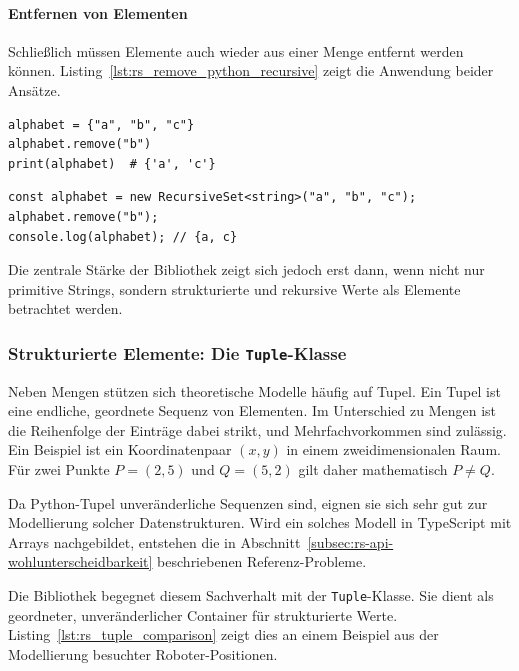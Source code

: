 \paragraph{Entfernen von Elementen}
Schließlich müssen Elemente auch wieder aus einer Menge entfernt werden können. Listing~\ref{lst:rs_remove_python_recursive} zeigt die Anwendung beider Ansätze.

\begin{listing}[ht]
    \caption{Entfernen von Elementen in Python und mit \texttt{RecursiveSet}}
    \label{lst:rs_remove_python_recursive}
    \begin{verbatim}
alphabet = {"a", "b", "c"}
alphabet.remove("b")
print(alphabet)  # {'a', 'c'}
    \end{verbatim}
    
    
    
    \begin{verbatim}
const alphabet = new RecursiveSet<string>("a", "b", "c");
alphabet.remove("b");
console.log(alphabet); // {a, c}
    \end{verbatim}
\end{listing}

Die zentrale Stärke der Bibliothek zeigt sich jedoch erst dann, wenn nicht nur primitive Strings, sondern strukturierte und rekursive Werte als Elemente betrachtet werden.

\subsubsection{Strukturierte Elemente: Die \texttt{Tuple}-Klasse}
\label{subsubsec:rs-api-tuple}

Neben Mengen stützen sich theoretische Modelle häufig auf Tupel. Ein Tupel ist eine endliche, geordnete Sequenz von Elementen. Im Unterschied zu Mengen ist die Reihenfolge der Einträge dabei strikt, und Mehrfachvorkommen sind zulässig. Ein Beispiel ist ein Koordinatenpaar $(x, y)$ in einem zweidimensionalen Raum. Für zwei Punkte $P = (2, 5)$ und $Q = (5, 2)$ gilt daher mathematisch $P \neq Q$.

Da Python-Tupel unveränderliche Sequenzen sind, eignen sie sich sehr gut zur Modellierung solcher Datenstrukturen. Wird ein solches Modell in TypeScript mit Arrays nachgebildet, entstehen die in Abschnitt~\ref{subsec:rs-api-wohlunterscheidbarkeit} beschriebenen Referenz-Probleme. 

Die Bibliothek begegnet diesem Sachverhalt mit der \texttt{Tuple}-Klasse. Sie dient als geordneter, unveränderlicher Container für strukturierte Werte. Listing~\ref{lst:rs_tuple_comparison} zeigt dies an einem Beispiel aus der Modellierung besuchter Roboter-Positionen. 

